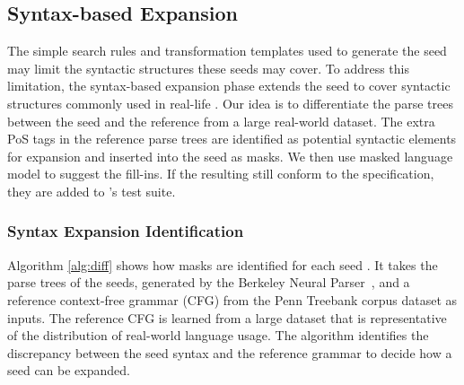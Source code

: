 \subsection{Syntax-based \Sent Expansion}

The simple search rules and transformation templates used to generate
the seed \sents may limit the syntactic structures these seeds may
cover. To address this limitation, the syntax-based \sent expansion
phase extends the seed \sents to cover syntactic structures
commonly used in real-life \sents. Our idea is to differentiate the
parse trees between the seed \sents and the reference \sents
from a large real-world dataset. The extra PoS tags in the reference
parse trees are identified as potential syntactic elements for
expansion and inserted into the seed \sents as masks. We then use
masked language model to suggest the fill-ins. If the resulting
\sents still conform to the \lc specification,
they are added to \tool{}'s test suite. 

\subsubsection{Syntax Expansion Identification}

Algorithm \ref{alg:diff} shows how masks are identified for each seed
\sent.  It takes the parse trees of the seeds, generated by the
Berkeley Neural
Parser~\cite{kitaev2018seedparser,kitaev2019seedparser}, and a
reference context-free grammar (CFG) from the Penn Treebank corpus
dataset \cite{} as inputs.  The reference CFG is learned from a large
dataset \cite{} that is representative of the distribution of
real-world language usage.  The algorithm identifies the discrepancy
between the seed syntax and the reference grammar to decide how a seed
can be expanded.



